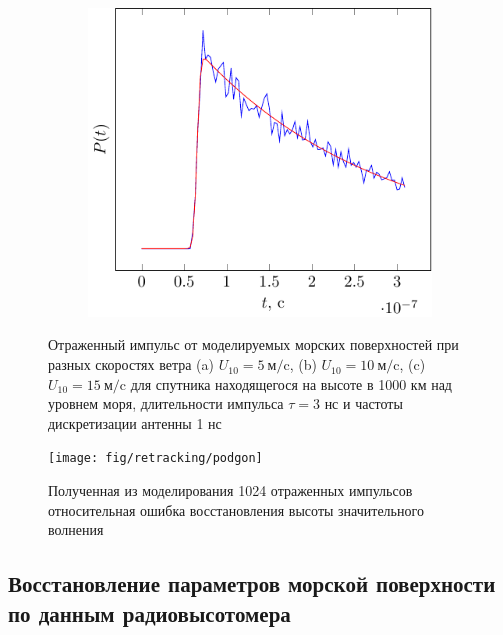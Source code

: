 \begin{figure}[H]
\begin{subfigure}{0.49\linewidth}
    \end{subfigure}
    \begin{subfigure}{0.49\linewidth}
        \centering
        \includegraphics[width=\linewidth,page=2]{fig/retracking/model}
    \end{subfigure}
    \caption{Отраженный импульс от моделируемых морских поверхностей при разных
    скоростях ветра (a) $U_{10}=5 ~\text{м}/\text{c}$, (b) $U_{10}=10
~\text{м}/\text{c}$, (c) $U_{10}=15 ~\text{м}/\text{c}$ для спутника
находящегося на высоте в 1000 км над уровнем моря, длительности импульса $\tau
= 3$ нс и частоты дискретизации антенны 1 нс}
    \label{fig:model_pulse_retracking}
\end{figure}
\begin{figure}[H]
    \centering
    \texttt{[image: fig/retracking/podgon]}
    \caption{Полученная из моделирования 1024 отраженных импульсов относительная
    ошибка восстановления высоты значительного волнения}
    \label{fig:podgon}
\end{figure}








\subsection{Восстановление параметров морской поверхности по данным
радиовысотомера}


